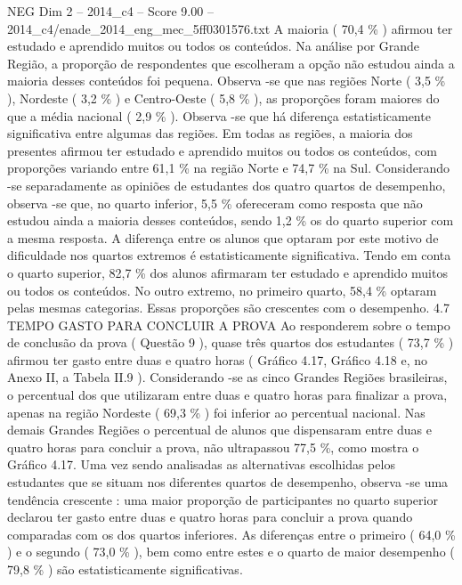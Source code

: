 \begin{textsample}{NEG Dim 2 – 2014\_c4 – Score 9.00 – 2014\_c4/enade\_2014\_eng\_mec\_5ff0301576.txt}
A maioria ( 70,4 \% ) afirmou ter estudado e aprendido muitos ou todos os conteúdos.
Na análise por Grande Região, a proporção de respondentes que escolheram a opção não estudou ainda a maioria desses conteúdos foi pequena.
Observa -se que nas regiões Norte ( 3,5 \% ), Nordeste ( 3,2 \% ) e Centro-Oeste ( 5,8 \% ), as proporções foram maiores do que a média nacional ( 2,9 \% ).
Observa -se que há diferença estatisticamente significativa entre algumas das regiões.
Em todas as regiões, a maioria dos presentes afirmou ter estudado e aprendido muitos ou todos os conteúdos, com proporções variando entre 61,1 \% na região Norte e 74,7 \% na Sul.
Considerando -se separadamente as opiniões de estudantes dos quatro quartos de desempenho, observa -se que, no quarto inferior, 5,5 \% ofereceram como resposta que não estudou ainda a maioria desses conteúdos, sendo 1,2 \% os do quarto superior com a mesma resposta.
A diferença entre os alunos que optaram por este motivo de dificuldade nos quartos extremos é estatisticamente significativa.
Tendo em conta o quarto superior, 82,7 \% dos alunos afirmaram ter estudado e aprendido muitos ou todos os conteúdos.
No outro extremo, no primeiro quarto, 58,4 \% optaram pelas mesmas categorias.
Essas proporções são crescentes com o desempenho. 4.7 TEMPO GASTO PARA CONCLUIR A PROVA Ao responderem sobre o tempo de conclusão da prova ( Questão 9 ), quase três quartos dos estudantes ( 73,7 \% ) afirmou ter gasto entre duas e quatro horas ( Gráfico 4.17, Gráfico 4.18 e, no Anexo II, a Tabela II.9 ).
Considerando -se as cinco Grandes Regiões brasileiras, o percentual dos que utilizaram entre duas e quatro horas para finalizar a prova, apenas na região Nordeste ( 69,3 \% ) foi inferior ao percentual nacional.
Nas demais Grandes Regiões o percentual de alunos que dispensaram entre duas e quatro horas para concluir a prova, não ultrapassou 77,5 \%, como mostra o Gráfico 4.17.
Uma vez sendo analisadas as alternativas escolhidas pelos estudantes que se situam nos diferentes quartos de desempenho, observa -se uma tendência crescente : uma maior proporção de participantes no quarto superior declarou ter gasto entre duas e quatro horas para concluir a prova quando comparadas com os dos quartos inferiores.
As diferenças entre o primeiro ( 64,0 \% ) e o segundo ( 73,0 \% ), bem como entre estes e o quarto de maior desempenho ( 79,8 \% ) são estatisticamente significativas.

\end{textsample}
